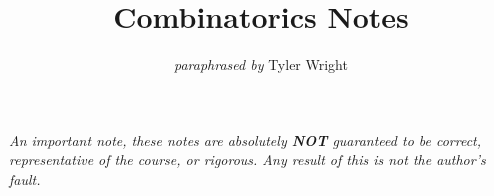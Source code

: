 \documentclass[a4paper, 12pt, twoside]{article}
\begin{document}
\title{Combinatorics Notes}
\date{}
\author{\textit{paraphrased by} Tyler Wright}
\maketitle

\vfill

\textit{An important note, these notes are absolutely \textbf{NOT}
  guaranteed to be correct, representative of the course, or rigorous.
  Any result of this is not the author's fault.}

\addtocounter{section}{-1}



\newpage

\tableofcontents











\end{document}
